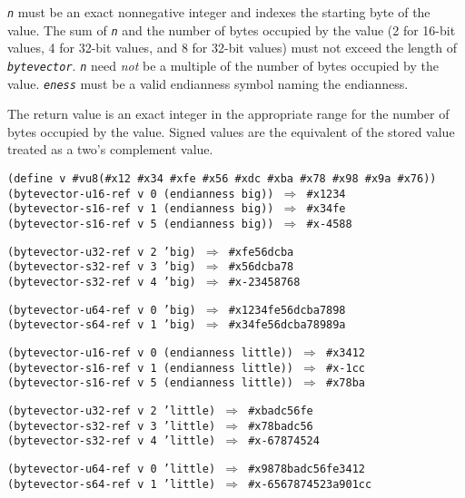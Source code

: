 \texttt{\textit{n}} must be an exact nonnegative integer and
indexes the starting byte of the value.
The sum of \texttt{\textit{n}} and the number of bytes occupied by the value
(2 for 16-bit values, 4 for 32-bit values, and 8 for 32-bit values)
must not exceed the length of \texttt{\textit{bytevector}}.
\texttt{\textit{n}} need \textit{not} be a multiple of the
number of bytes occupied by the value.
\texttt{\textit{eness}} must be a valid endianness symbol naming the endianness.

The return value is an exact integer in the appropriate range for
the number of bytes occupied by the value.
Signed values are the equivalent of the stored value treated as a two's
complement value.


\begin{alltt}
(define v \#{}vu8(\#{}x12 \#{}x34 \#{}xfe \#{}x56 \#{}xdc \#{}xba \#{}x78 \#{}x98 \#{}x9a \#{}x76))
(bytevector-u16-ref v 0 (endianness big)) \(\Rightarrow\) \#{}x1234
(bytevector-s16-ref v 1 (endianness big)) \(\Rightarrow\) \#{}x34fe
(bytevector-s16-ref v 5 (endianness big)) \(\Rightarrow\) \#{}x-4588

(bytevector-u32-ref v 2 'big) \(\Rightarrow\) \#{}xfe56dcba
(bytevector-s32-ref v 3 'big) \(\Rightarrow\) \#{}x56dcba78
(bytevector-s32-ref v 4 'big) \(\Rightarrow\) \#{}x-23458768

(bytevector-u64-ref v 0 'big) \(\Rightarrow\) \#{}x1234fe56dcba7898
(bytevector-s64-ref v 1 'big) \(\Rightarrow\) \#{}x34fe56dcba78989a

(bytevector-u16-ref v 0 (endianness little)) \(\Rightarrow\) \#{}x3412
(bytevector-s16-ref v 1 (endianness little)) \(\Rightarrow\) \#{}x-1cc
(bytevector-s16-ref v 5 (endianness little)) \(\Rightarrow\) \#{}x78ba

(bytevector-u32-ref v 2 'little) \(\Rightarrow\) \#{}xbadc56fe
(bytevector-s32-ref v 3 'little) \(\Rightarrow\) \#{}x78badc56
(bytevector-s32-ref v 4 'little) \(\Rightarrow\) \#{}x-67874524

(bytevector-u64-ref v 0 'little) \(\Rightarrow\) \#{}x9878badc56fe3412
(bytevector-s64-ref v 1 'little) \(\Rightarrow\) \#{}x-6567874523a901cc
\end{alltt}

